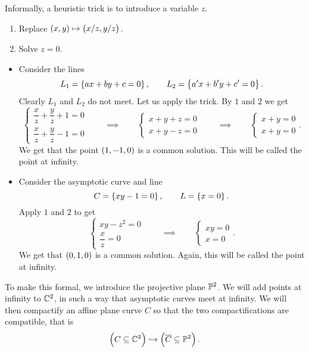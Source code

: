 Informally, a heuristic trick is to introduce a variable $ z $.
\begin{enumerate}
\item Replace $ \br{x, y} \mapsto \br{x / z, y / z} $.
\item Solve $ z = 0 $.
\end{enumerate}

\begin{example}
\hfill
\begin{itemize}
\item Consider the lines
$$ L_1 = \cbr{ax + by + c = 0}, \qquad L_2 = \cbr{a'x + b'y + c' = 0}. $$
Clearly $ L_1 $ and $ L_2 $ do not meet. Let us apply the trick. By $ 1 $ and $ 2 $ we get
$$
\begin{cases}
\dfrac{x}{z} + \dfrac{y}{z} + 1 = 0 \\
\dfrac{x}{z} + \dfrac{y}{z} - 1 = 0
\end{cases}
\qquad \implies \qquad
\begin{cases}
x + y + z = 0 \\
x + y - z = 0
\end{cases}
\qquad \implies \qquad
\begin{cases}
x + y = 0 \\
x + y = 0
\end{cases}.
$$
We get that the point $ \br{1, -1, 0} $ is a common solution. This will be called the point at infinity.
\item Consider the asymptotic curve and line
$$ C = \cbr{xy - 1 = 0}, \qquad L = \cbr{x = 0}. $$
Apply $ 1 $ and $ 2 $ to get
$$
\begin{cases}
xy - z^2 = 0 \\
\dfrac{x}{z} = 0
\end{cases}
\qquad \implies \qquad
\begin{cases}
xy = 0 \\
x = 0
\end{cases}.
$$
We get that $ \br{0, 1, 0} $ is a common solution. Again, this will be called the point at infinity.
\end{itemize}
\end{example}

To make this formal, we introduce the projective plane $ \P^2 $. We will add points at infinity to $ \C^2 $, in such a way that asymptotic curves meet at infinity. We will then compactify an affine plane curve $ C $ so that the two compactifications are compatible, that is
$$ \br{C \subseteq \C^2} \hookrightarrow \br{\overline{C} \subseteq \P^2}. $$


